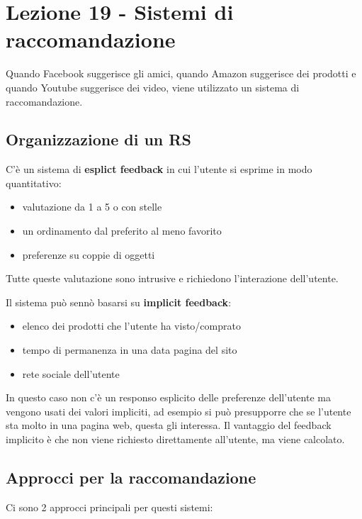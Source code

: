 \section{Lezione 19 - Sistemi di
raccomandazione}\label{lezione-19---sistemi-di-raccomandazione}

Quando Facebook suggerisce gli amici, quando Amazon suggerisce dei
prodotti e quando Youtube suggerisce dei video, viene utilizzato un
sistema di raccomandazione.

\subsection{Organizzazione di un RS}\label{organizzazione-di-un-rs}

C'è un sistema di \textbf{esplict feedback} in cui l'utente si esprime in modo
quantitativo:

\begin{itemize}
\item
  valutazione da 1 a 5 o con stelle
\item
  un ordinamento dal preferito al meno favorito
\item
  preferenze su coppie di oggetti
\end{itemize}

Tutte queste valutazione sono intrusive e richiedono l'interazione
dell'utente.

Il sistema può sennò basarsi su \textbf{implicit feedback}:

\begin{itemize}
\item
  elenco dei prodotti che l'utente ha visto/comprato
\item
  tempo di permanenza in una data pagina del sito
\item
  rete sociale dell'utente
\end{itemize}

In questo caso non c'è un responso esplicito delle preferenze
dell'utente ma vengono usati dei valori impliciti, ad esempio si può
presupporre che se l'utente sta molto in una pagina web, questa gli
interessa. 
Il vantaggio del feedback implicito è che non viene richiesto
direttamente all'utente, ma viene calcolato.

\subsection{Approcci per la raccomandazione}\label{approcci-per-la-raccomandazione}

Ci sono 2 approcci principali per questi sistemi:

